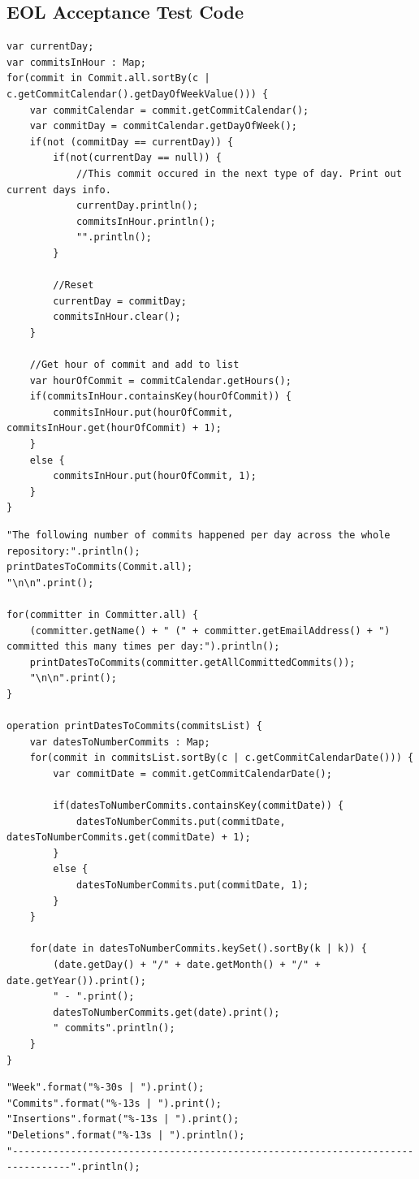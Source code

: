\documentclass[11pt]{book}
\begin{document}
\begin{appendices}
\noappendicestocpagenum
\addappheadtotoc
\chapter{EOL Acceptance Test Code}
\label{eolacceptance}

\begin{lstlisting}[caption=Punchcard, label=lst:punchcard]
var currentDay;
var commitsInHour : Map;
for(commit in Commit.all.sortBy(c | c.getCommitCalendar().getDayOfWeekValue())) {
	var commitCalendar = commit.getCommitCalendar();
	var commitDay = commitCalendar.getDayOfWeek();
	if(not (commitDay == currentDay)) {
		if(not(currentDay == null)) {
			//This commit occured in the next type of day. Print out current days info.
			currentDay.println();
			commitsInHour.println();
			"".println();
		}
		
		//Reset
		currentDay = commitDay;
		commitsInHour.clear();
	}
	
	//Get hour of commit and add to list
	var hourOfCommit = commitCalendar.getHours();
	if(commitsInHour.containsKey(hourOfCommit)) {
		commitsInHour.put(hourOfCommit, commitsInHour.get(hourOfCommit) + 1);
	}
	else {
		commitsInHour.put(hourOfCommit, 1);
	}
}
\end{lstlisting}
\clearpage
\begin{lstlisting}[caption=Contribution Dates, label=lst:contributiondates]
"The following number of commits happened per day across the whole repository:".println();
printDatesToCommits(Commit.all);
"\n\n".print();

for(committer in Committer.all) {
	(committer.getName() + " (" + committer.getEmailAddress() + ") committed this many times per day:").println();
	printDatesToCommits(committer.getAllCommittedCommits());
	"\n\n".print();
}

operation printDatesToCommits(commitsList) {  
	var datesToNumberCommits : Map;
	for(commit in commitsList.sortBy(c | c.getCommitCalendarDate())) {
		var commitDate = commit.getCommitCalendarDate();
	
		if(datesToNumberCommits.containsKey(commitDate)) {
			datesToNumberCommits.put(commitDate, datesToNumberCommits.get(commitDate) + 1);
		}
		else {
			datesToNumberCommits.put(commitDate, 1);
		}
	}
	
	for(date in datesToNumberCommits.keySet().sortBy(k | k)) {
		(date.getDay() + "/" + date.getMonth() + "/" + date.getYear()).print();
		" - ".print();
		datesToNumberCommits.get(date).print();
		" commits".println();
	}
}
\end{lstlisting}
\clearpage
\begin{lstlisting}[caption=Commit frequency, label=lst:commitfrequency]
"Week".format("%-30s | ").print();
"Commits".format("%-13s | ").print();
"Insertions".format("%-13s | ").print();
"Deletions".format("%-13s | ").println();
"--------------------------------------------------------------------------------".println();



\end{lstlisting}
\end{appendices}
\end{document}

